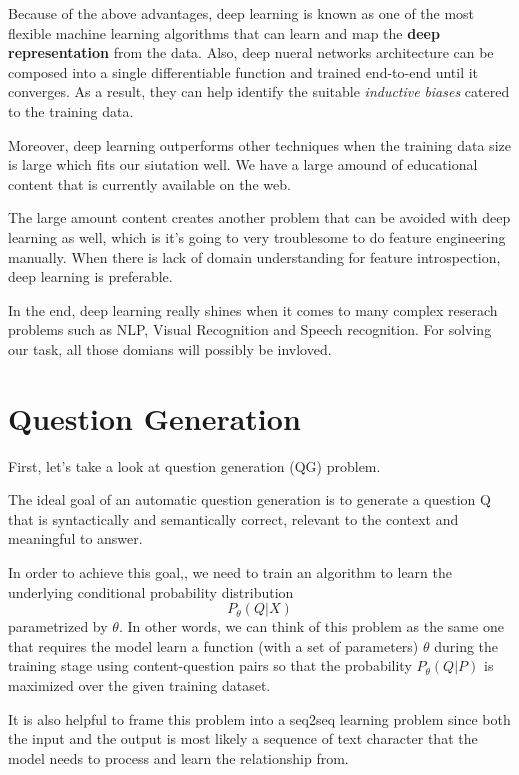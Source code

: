 \documentclass[]{book}
\theoremstyle{definition}
\theoremstyle{definition}
\theoremstyle{definition}
\theoremstyle{remark}
\begin{document}
Because of the above advantages, deep learning is known as one of the
most flexible machine learning algorithms that can learn and map the
\textbf{deep representation} from the data. Also, deep nueral networks
architecture can be composed into a single differentiable function and
trained end-to-end until it converges. As a result, they can help
identify the suitable \emph{inductive} \emph{biases} catered to the
training data.

Moreover, deep learning outperforms other techniques when the training
data size is large which fits our siutation well. We have a large amound
of educational content that is currently available on the web.

The large amount content creates another problem that can be avoided
with deep learning as well, which is it's going to very troublesome to
do feature engineering manually. When there is lack of domain
understanding for feature introspection, deep learning is preferable.

In the end, deep learning really shines when it comes to many complex
reserach problems such as NLP, Visual Recognition and Speech
recognition. For solving our task, all those domians will possibly be
invloved.

\section{Question Generation}\label{question-generation}

First, let's take a look at question generation (QG) problem.

The ideal goal of an automatic question generation is to generate a
question Q that is syntactically and semantically correct, relevant to
the context and meaningful to answer.

In order to achieve this goal,, we need to train an algorithm to learn
the underlying conditional probability distribution \[P_{\theta}(Q|X)\]
parametrized by \(\theta\). In other words, we can think of this problem
as the same one that requires the model learn a function (with a set of
parameters) \(\theta\) during the training stage using content-question
pairs so that the probability \(P_{\theta}(Q|P)\) is maximized over the
given training dataset.

It is also helpful to frame this problem into a seq2seq learning problem
since both the input and the output is most likely a sequence of text
character that the model needs to process and learn the relationship
from.
\end{document}
